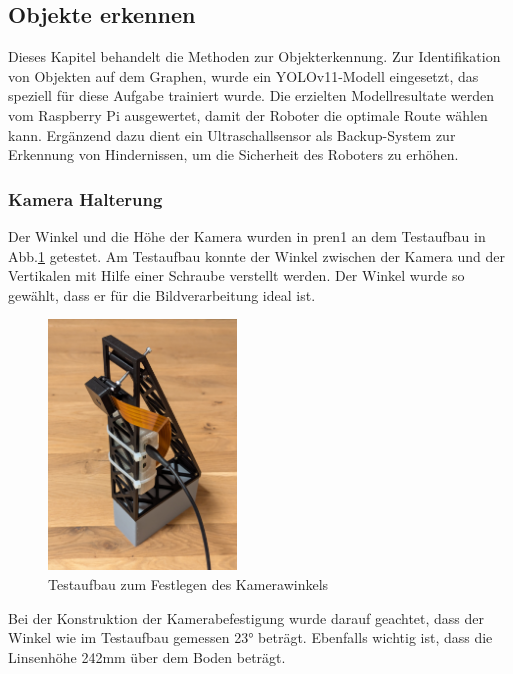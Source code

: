 
\subsection{Objekte erkennen}

Dieses Kapitel behandelt die Methoden zur Objekterkennung. Zur Identifikation von Objekten auf dem Graphen, wurde ein YOLOv11-Modell eingesetzt, das speziell für diese Aufgabe trainiert wurde. Die erzielten Modellresultate werden vom Raspberry Pi ausgewertet, damit der Roboter die optimale Route wählen kann. Ergänzend dazu dient ein Ultraschallsensor als Backup-System zur Erkennung von Hindernissen, um die Sicherheit des Roboters zu erhöhen. 

\subsubsection{Kamera Halterung}
\label{Kamera Halter}

Der Winkel und die Höhe der Kamera wurden in \acrshort{pren1} an dem Testaufbau in Abb.\ref{fig:Testaufbau zum Festlegen des Kamerawinkels} getestet. Am Testaufbau konnte der Winkel zwischen der Kamera und der Vertikalen mit Hilfe einer Schraube verstellt werden. Der Winkel wurde so gewählt, dass er für die Bildverarbeitung ideal ist. 

\begin{figure}[H]
\centering
\includegraphics[width=5cm]{assets/MT/camer_tower_2.png}
\caption{Testaufbau zum Festlegen des Kamerawinkels}
\label{fig:Testaufbau zum Festlegen des Kamerawinkels}
\end{figure}


Bei der Konstruktion der Kamerabefestigung wurde darauf geachtet, dass der Winkel wie im Testaufbau gemessen 23° beträgt. Ebenfalls wichtig ist, dass die Linsenhöhe 242mm über dem Boden beträgt. 

